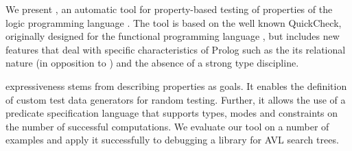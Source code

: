 

We present \plqc{}, an automatic tool for property-based
testing of properties of the logic programming language \Prolog{}.
%
The tool is based on the well known QuickCheck, originally designed
for the functional programming language \Haskell{}, but includes new
features that deal with specific characteristics of Prolog such as the
its relational nature (in opposition to \Haskell{}) and the absence
of a strong type discipline.


\plqc{} expressiveness stems from describing properties as
\Prolog{} goals.
%
It enables the definition of custom test data generators for
random testing.
%
Further, it allows the use of a predicate specification language that
supports types, modes and constraints on the number of successful
computations.
%
We evaluate our tool on a number of  examples and apply
it successfully to debugging a \Prolog{} library for AVL search trees.

